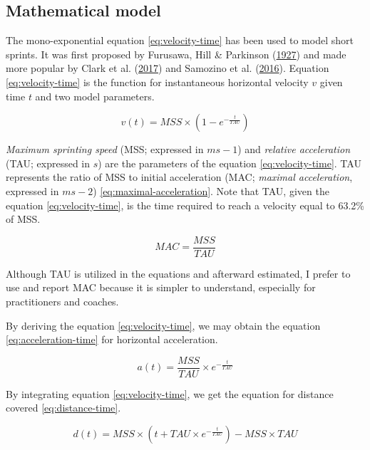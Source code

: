\documentclass[fleqn,10pt,lineno]{wlpeerj} %
\begin{document}
\hypertarget{mathematical-model}{%
\subsection{Mathematical model}\label{mathematical-model}}

The mono-exponential equation \eqref{eq:velocity-time} has been used to model short sprints. It was first proposed by Furusawa, Hill \& Parkinson (\protect\hyperlink{ref-doi:10.1098ux2frspb.1927.0035}{1927}) and made more popular by Clark et al. (\protect\hyperlink{ref-clarkNFLCombine40Yard2017}{2017}) and Samozino et al. (\protect\hyperlink{ref-samozinoSimpleMethodMeasuring2016}{2016}). Equation \eqref{eq:velocity-time} is the function for instantaneous horizontal velocity \(v\) given time \(t\) and two model parameters.

\begin{equation}
  v(t) = MSS \times (1 - e^{-\frac{t}{TAU}}) \label{eq:velocity-time}
\end{equation}

\emph{Maximum sprinting speed} (MSS; expressed in \(ms-1\)) and \emph{relative acceleration} (TAU; expressed in \(s\)) are the parameters of the equation \eqref{eq:velocity-time}. TAU represents the ratio of MSS to initial acceleration (MAC; \emph{maximal acceleration}, expressed in \(ms-2\)) \eqref{eq:maximal-acceleration}. Note that TAU, given the equation \eqref{eq:velocity-time}, is the time required to reach a velocity equal to 63.2\% of MSS.

\begin{equation}
  MAC = \frac{MSS}{TAU}\label{eq:maximal-acceleration}
\end{equation}

Although TAU is utilized in the equations and afterward estimated, I prefer to use and report MAC because it is simpler to understand, especially for practitioners and coaches.

By deriving the equation \eqref{eq:velocity-time}, we may obtain the equation \eqref{eq:acceleration-time} for horizontal acceleration.

\begin{equation}
  a(t) = \frac{MSS}{TAU} \times e^{-\frac{t}{TAU}}  \label{eq:acceleration-time}
\end{equation}

By integrating equation \eqref{eq:velocity-time}, we get the equation for distance covered \eqref{eq:distance-time}.

\begin{equation}
  d(t) = MSS \times (t + TAU \times e^{-\frac{t}{TAU}}) - MSS \times TAU  \label{eq:distance-time}
\end{equation}
\end{document}
